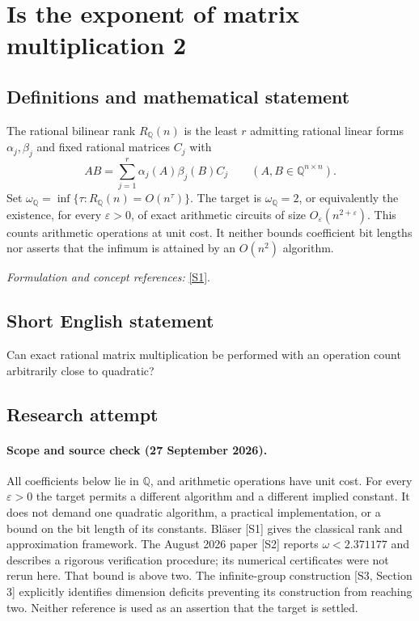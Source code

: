\documentclass[11pt]{article}
\begin{document}
\section*{\texorpdfstring{Is the exponent of matrix multiplication 2}{Is the exponent of matrix multiplication 2}}\label{statement}
\subsection{Definitions and mathematical statement}
The rational bilinear rank $R_{{\mathbb{Q}}}(n)$ is the least $r$ admitting rational linear forms $\alpha_j,\beta_j$ and fixed rational matrices $C_j$ with
\[
 AB=\sum_{j=1}^r\alpha_j(A)\beta_j(B)C_j\qquad(A,B\in{\mathbb{Q}}^{n\times n}).
\]
Set $\omega_{{\mathbb{Q}}}=\inf\{\tau:R_{{\mathbb{Q}}}(n)=O(n^\tau)\}$. The target is $\omega_{{\mathbb{Q}}}=2$, or equivalently the existence, for every $\varepsilon>0$, of exact arithmetic circuits of size $O_\varepsilon(n^{2+\varepsilon})$. This counts arithmetic operations at unit cost. It neither bounds coefficient bit lengths nor asserts that the infimum is attained by an $O(n^2)$ algorithm.
\par\smallskip\textit{Formulation and concept references:} \href{https://theoryofcomputing.org/articles/gs005/gs005.pdf}{[S1]}.

\subsection{Short English statement}
Can exact rational matrix multiplication be performed with an operation count arbitrarily close to quadratic?
\subsection{Research attempt}

\paragraph{Scope and source check (27 September 2026).}
All coefficients below lie in $\mathbb Q$, and arithmetic operations have
unit cost. For every $\varepsilon>0$ the target permits a different
algorithm and a different implied constant. It does not demand one
quadratic algorithm, a practical implementation, or a bound on the bit
length of its constants. Bl\"aser [S1] gives the classical rank and
approximation framework. The August 2026 paper [S2] reports
$\omega<2.371177$ and describes a rigorous verification procedure;
its numerical certificates were not rerun here. That bound is above two.
The infinite-group construction [S3, Section 3] explicitly identifies
dimension deficits preventing its construction from reaching two.
Neither reference is used as an assertion that the target is settled.
\end{document}
